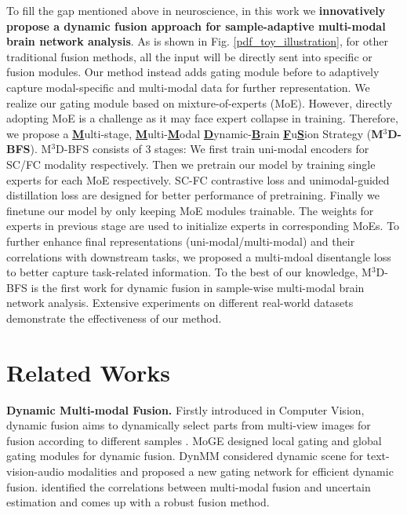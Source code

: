\documentclass[10pt,twocolumn,letterpaper]{article}
\newcommand{\model}{M$^3$D-BFS }
\begin{document}
To fill the gap mentioned above in neuroscience, in this work we \textbf{innovatively propose a dynamic fusion approach for sample-adaptive multi-modal brain network analysis}. As is shown in Fig. \ref{pdf_toy_illustration}, for other traditional fusion methods, all the input will be directly sent into specific or fusion modules. Our method instead adds gating module before to adaptively capture modal-specific and multi-modal data for further representation. We realize our gating module based on mixture-of-experts (MoE). However, directly adopting MoE is a challenge as it may face expert collapse in training. Therefore, we propose a \underline{\textbf{M}}ulti-stage, \underline{\textbf{M}}ulti-\underline{\textbf{M}}odal \underline{\textbf{D}}ynamic-\underline{\textbf{B}}rain \underline{\textbf{F}}u\underline{\textbf{S}}ion Strategy (\textbf{M$^3$D-BFS}). \model consists of 3 stages: We first train uni-modal encoders for SC/FC modality respectively. Then we pretrain our model by training single experts for each MoE respectively. SC-FC contrastive loss and unimodal-guided distillation loss are designed for better performance of pretraining. Finally we finetune our model by only keeping MoE modules trainable. The weights for experts in previous stage are used to initialize experts in corresponding MoEs. To further enhance final representations (uni-modal/multi-modal) and their correlations with downstream tasks, we proposed a multi-mdoal disentangle loss to better capture task-related information. To the best of our knowledge, \model is the first work for dynamic fusion in sample-wise multi-modal brain network analysis. Extensive experiments on different real-world datasets demonstrate the effectiveness of our method. 

\section{Related Works}

\noindent\textbf{Dynamic Multi-modal Fusion.} Firstly introduced in Computer Vision, dynamic fusion aims to dynamically select parts from multi-view images for fusion according to different samples \cite{han2022multimodal}. MoGE \cite{Cao_2023_ICCV} designed local gating and global gating modules for dynamic fusion. DynMM \cite{xue2023dynamic} considered dynamic scene for text-vision-audio modalities and proposed a new gating network for efficient dynamic fusion. \cite{zhang2023provable} identified the correlations between multi-modal fusion and uncertain estimation and comes up with a robust fusion method.
\end{document}
